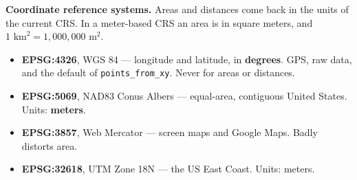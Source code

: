 \documentclass[11pt, a4paper]{article}
\newcommand{\code}[1]{\texttt{#1}}
\begin{document}
\smallskip

\textbf{Coordinate reference systems.}
Areas and distances come back in the units of the current CRS. In a meter-based CRS an area
is in square meters, and $1 \textrm{ km}^2 = 1{,}000{,}000 \textrm{ m}^2$.

\smallskip

\sloppy
\begin{itemize}
  \item \textbf{EPSG:4326}, WGS 84 --- longitude and latitude, in \textbf{degrees}. GPS,
        raw data, and the default of \code{points\_from\_xy}. Never for areas or distances.
  \item \textbf{EPSG:5069}, NAD83 Conus Albers --- equal-area, contiguous United States.
        Units: \textbf{meters}.
  \item \textbf{EPSG:3857}, Web Mercator --- screen maps and Google Maps. Badly distorts
        area.
  \item \textbf{EPSG:32618}, UTM Zone 18N --- the US East Coast. Units: meters.
\end{itemize}
\fussy
\end{document}
